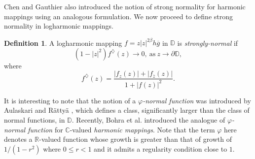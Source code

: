 \documentclass[11pt, reqno]{amsart}
\theoremstyle{definition}
\newtheorem{definition}[theorem]{Definition}
\theoremstyle{remark}
\numberwithin{equation}{section}
\begin{document}
Chen and Gauthier \cite{chen-osnf-1996} also introduced the notion of strong normality for harmonic mappings using an 
analogous formulation. We now proceed to define strong normality in logharmonic mappings. 
\begin{definition}
A logharmonic mapping $f=z|z|^{2\beta}h\overline{g}$ in $\mathbb{D}$ is \emph{strongly-normal} if \begin{equation*}(1-|z|^2)f^\diamondsuit(z)\to0,\ \text{as}\ z\to\partial\mathbb D,\end{equation*}
where \begin{equation*}f^\diamondsuit(z)=\dfrac{|f_z(z)|+|f_{\overline{z}}(z)|}{1+|f(z)|^2}.\end{equation*}
\end{definition}
It is interesting to note that the notion of a \emph{$\varphi$-normal function} was introduced by 
Aulaskari and R\"atty\"a \cite{aulaskari-pompnf-2011}, which defines a class,
significantly larger than the class of normal functions, in $\mathbb{D}$. Recently, Bohra et al. 
\cite{bohra-lfptfpnhm-2025} introduced the analogue of \emph{$\varphi$-normal function} 
for $\mathbb C$-valued \emph{harmonic mappings}. Note that the term $\varphi$ here denotes a $\mathbb R$-valued 
function whose growth is greater than that of growth of $1/(1-r^2)$ where $0\leq r<1$ and it admits a regularity condition close to $1$. \smallskip
\end{document}
